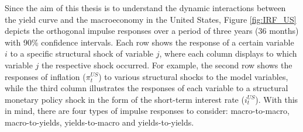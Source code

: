 


Since the aim of this thesis is to understand the dynamic interactions
between the yield curve and the macroeconomy in the United States, Figure \ref{fig:IRF_US} depicts the orthogonal impulse responses over a period of three years (36 months) with 90\% confidence intervals. 
Each row shows the response of a certain variable $i$ to a specific structural shock of variable $j$, where each column displays to which variable $j$ the respective shock occurred. 
For example, the second row shows the responses of inflation ($\pi^{US}_{t}$) to various structural shocks to the model variables, while the third column illustrates the responses of each variable to a structural monetary policy shock in the form of the short-term interest rate ($i^{US}_{t}$). 
With this in mind, there are four types of impulse responses to consider: macro-to-macro, macro-to-yields, yields-to-macro and yields-to-yields.  



